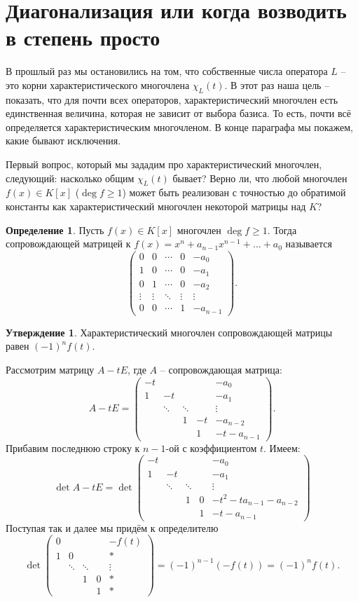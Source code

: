 \documentclass[10pt,a4paper,oneside]{book}
\theoremstyle{definition}
\newtheorem*{defn}{\color{yellow!30!red} Определение}
\newtheorem{utvr}{\color{blue!50!black}Утверждение}
\renewcommand{\geq}{\geqslant}
\def\dfn{\begin{defn}}
\def\edfn{\end{defn}}
\def\pmat{\begin{pmatrix}}
\def\epmat{\end{pmatrix}}
\def\utv{\begin{utvr}}
\def\eutv{\end{utvr}}
\begin{document}
\section{Диагонализация или когда возводить в степень просто}

В прошлый раз мы остановились на том, что собственные числа оператора $L$ -- это корни характеристического многочлена $\chi_L(t)$. В этот раз наша цель -- показать, что  для почти всех операторов, характеристический многочлен есть единственная величина, которая не зависит от выбора базиса. То есть, почти всё определяется характеристическим многочленом. В конце параграфа мы покажем, какие бывают исключения.


Первый вопрос, который мы зададим про характеристический многочлен, следующий: насколько общим $\chi_L(t)$ бывает? Верно ли, что любой многочлен $f(x)\in K[x]$ ($\deg f \geq 1$) может быть реализован с точностью до обратимой константы как характеристический многочлен некоторой матрицы над $K$?

\dfn Пусть $f(x)\in K[x]$ многочлен $\deg f \geq 1$. Тогда сопровождающей матрицей к $f(x)=x^n+a_{n-1}x^{n-1}+\dots+a_0$ называется 
$$ \pmat 0&0&\cdots&0&-a_0\\
1&0&\cdots&0&-a_1\\
0&1&\cdots&0&-a_2\\
\vdots&\vdots&\ddots&\vdots&\vdots\\
0&0&\cdots&1&-a_{n-1}\epmat.$$
\edfn

\utv Характеристический многочлен сопровождающей матрицы равен $(-1)^n f(t)$.
\eutv
\proof Рассмотрим матрицу $A-tE$, где $A$ -- сопровождающая матрица:
$$A-tE= \pmat -t&&&&-a_0\\
1&-t&&&-a_1\\
&\ddots&\ddots&&\vdots\\
&&1&-t&-a_{n-2}\\
&&&1&-t-a_{n-1}\epmat.$$
Прибавим последнюю строку к $n-1$-ой с коэффициентом $t$. Имеем:
$$\det A-tE = \det \pmat -t&&&&-a_0\\
1&-t&&&-a_1\\
&\ddots&\ddots&&\vdots\\
&&1&0&-t^2-ta_{n-1}-a_{n-2}\\
&&&1&-t-a_{n-1}\epmat$$
Поступая так и далее мы придём к определителю
$$\det \pmat 0&&&&-f(t)\\
1&0&&&*\\
&\ddots&\ddots&&\vdots\\
&&1&0&*\\
&&&1&*\epmat=(-1)^{n-1}(-f(t))=(-1)^nf(t).$$
\endproof
\end{document}
